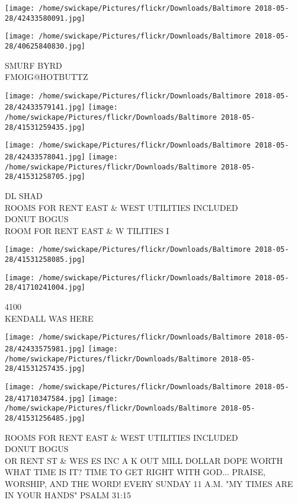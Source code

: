 \documentclass[10pt,letterpaper]{article}
\begin{document}
\texttt{[image: /home/swickape/Pictures/flickr/Downloads/Baltimore 2018-05-28/42433580091.jpg]}

\vspace{0.25in}
\texttt{[image: /home/swickape/Pictures/flickr/Downloads/Baltimore 2018-05-28/40625840830.jpg]}

SMURF BYRD\\
FMOIG@HOTBUTTZ\\
\pagebreak

\texttt{[image: /home/swickape/Pictures/flickr/Downloads/Baltimore 2018-05-28/42433579141.jpg]}
\texttt{[image: /home/swickape/Pictures/flickr/Downloads/Baltimore 2018-05-28/41531259435.jpg]}

\texttt{[image: /home/swickape/Pictures/flickr/Downloads/Baltimore 2018-05-28/42433578041.jpg]}
\texttt{[image: /home/swickape/Pictures/flickr/Downloads/Baltimore 2018-05-28/41531258705.jpg]}

DL SHAD\\
ROOMS FOR RENT EAST \& WEST UTILITIES INCLUDED\\
DONUT BOGUS\\
ROOM FOR RENT EAST \& W TILITIES I\\
\pagebreak

\texttt{[image: /home/swickape/Pictures/flickr/Downloads/Baltimore 2018-05-28/41531258085.jpg]}

\vspace{0.25in}
\texttt{[image: /home/swickape/Pictures/flickr/Downloads/Baltimore 2018-05-28/41710241004.jpg]}

4100\\
KENDALL WAS HERE\\
\pagebreak

\texttt{[image: /home/swickape/Pictures/flickr/Downloads/Baltimore 2018-05-28/42433575981.jpg]}
\texttt{[image: /home/swickape/Pictures/flickr/Downloads/Baltimore 2018-05-28/41531257435.jpg]}

\texttt{[image: /home/swickape/Pictures/flickr/Downloads/Baltimore 2018-05-28/41710347584.jpg]}
\texttt{[image: /home/swickape/Pictures/flickr/Downloads/Baltimore 2018-05-28/41531256485.jpg]}

ROOMS FOR RENT EAST \& WEST UTILITIES INCLUDED\\
DONUT BOGUS\\
OR RENT ST \& WES ES INC A K OUT MILL DOLLAR DOPE WORTH\\
WHAT TIME IS IT?  TIME TO GET RIGHT WITH GOD... PRAISE, WORSHIP, AND THE WORD!  EVERY SUNDAY 11 A.M.  "MY TIMES ARE IN YOUR HANDS" PSALM 31:15\\
\pagebreak
\end{document}
